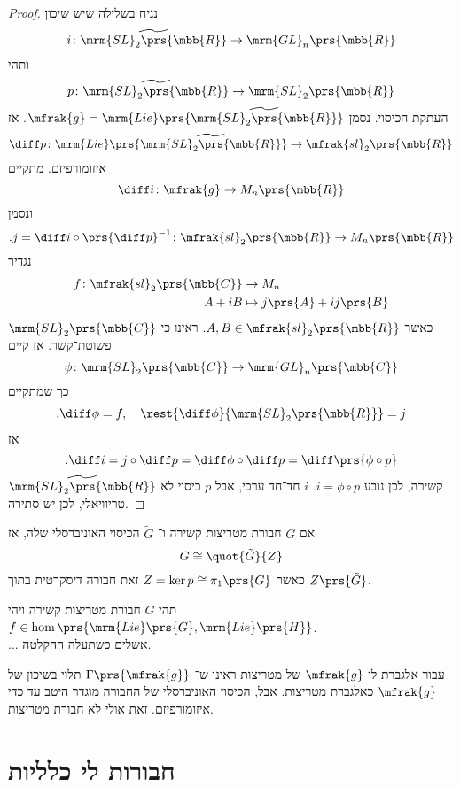 \documentclass[10pt, twoside]{book}
\newcommand{\Lie}{\mrm{Lie}}
\begin{document}
\begin{proof}
נניח בשלילה שיש שיכון
\[i \colon \widetilde{\mrm{SL}_2\prs{\mbb{R}}} \to \mrm{GL}_n\prs{\mbb{R}}\]
ותהי
\[p \colon \widetilde{\mrm{SL}_2\prs{\mbb{R}}} \to \mrm{SL}_2\prs{\mbb{R}}\]
העתקת הכיסוי.
נסמן
$\mfrak{g} = \Lie\prs{\widetilde{\mrm{SL}_2\prs{\mbb{R}}}}$.
אז
\[\diff p \colon \Lie\prs{\widetilde{\mrm{SL}_2\prs{\mbb{R}}}} \to \mfrak{sl}_2\prs{\mbb{R}}\]
איזומורפיזם. מתקיים
\[\diff i \colon \mfrak{g} \to M_n\prs{\mbb{R}}\]
ונסמן
\[\text{.} j = \diff i \circ \prs{\diff p}^{-1} \colon \mfrak{sl}_2\prs{\mbb{R}} \to M_n\prs{\mbb{R}}\]
נגדיר
\begin{align*}
f \colon \mfrak{sl}_2\prs{\mbb{C}} &\to M_n \\
A + iB &\mapsto j\prs{A} + i j\prs{B}
\end{align*}
כאשר
$A,B \in \mfrak{sl}_2\prs{\mbb{R}}$.
ראינו כי
$\mrm{SL}_2\prs{\mbb{C}}$
פשוטת־קשר.
אז קיים
\[\phi \colon \mrm{SL}_2\prs{\mbb{C}} \to \mrm{GL}_n\prs{\mbb{C}}\]
כך שמתקיים
\begin{align*}
\text{.}\diff \phi = f, \quad \rest{\diff \phi}{\mrm{SL}_2\prs{\mbb{R}}} = j
\end{align*}
אז
\[\text{.}\diff i = j \circ \diff p = \diff \phi \circ \diff p = \diff \prs{\phi \circ p}\]
$\widetilde{\mrm{SL}_2\prs{\mbb{R}}}$
קשירה, לכן נובע
$i = \phi \circ p$.
$i$
חד־חד ערכי, אבל
$p$
כיסוי לא טריוויאלי, לכן יש סתירה.
\end{proof}

\begin{remark}
אם
$G$
חבורת מטריצות קשירה ו־%
$\tilde{G}$
הכיסוי האוניברסלי שלה, אז
\[G \cong \quot{\tilde{G}}{Z}\]
כאשר
$Z = \ker p \cong \pi_1\prs{G}$
זאת חבורה דיסקרטית בתוך
$Z\prs{\tilde{G}}$.
\end{remark}

\begin{fact}
תהי
$G$
חבורת מטריצות קשירה ויהי
$f \in \hom\prs{\Lie\prs{G}, \Lie\prs{H}}$.
\\
... אשלים כשתעלה ההקלטה.
\end{fact}

עבור אלגברת לי
$\mfrak{g}$
של מטריצות ראינו ש־%
$\Gamma\prs{\mfrak{g}}$
תלוי בשיכון של
$\mfrak{g}$
כאלגברת מטריצות. אבל, הכיסוי האוניברסלי של החבורה מוגדר היטב עד כדי איזומורפיזם. זאת אולי לא חבורת מטריצות.

\section{חבורות לי כלליות}
\end{document}
